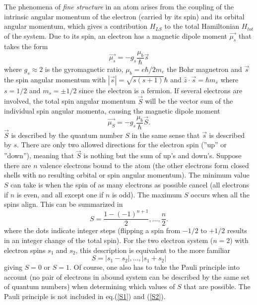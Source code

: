 \documentclass[a4paper]{article}
\begin{document}
The phenomena of \textit{fine structure} in an atom arises from the coupling of the intrinsic angular momentum of the electron (carried by its spin) and its orbital angular momentum, which gives a contribution $H_{LS}$ to the total Hamiltonian $H_{tot}$ of the system. Due to its spin, an electron has a magnetic dipole moment $\vec{\mu_s}$ that takes the form
\begin{equation}
\vec{\mu_s} = -g_s \frac{\mu_b}{\hbar} \vec{s}
\end{equation}
where $g_s \approx 2$ is the gyromagnetic ratio, $\mu_b = e \hbar / 2m_e$ the Bohr magnetron and $\vec{s}$ the spin angular momentum with $|\vec{s}|=\sqrt{s(s+1)} \hbar$ and $\hat{z} \cdot \vec{s} = \hbar m_s$ where $s=1/2$ and $m_s = \pm 1/2$ since the electron is a fermion. If several electrons are involved, the total spin angular momentum $\vec{S}$ will be the vector sum of the individual spin angular momenta, causing the magnetic dipole moment
\begin{equation}
\vec{\mu_S} = -g_s \frac{\mu_b}{\hbar} \vec{S}. 	\label{muS}
\end{equation}
$\vec{S}$ is described by the quantum number $S$ in the same sense that $\vec{s}$ is described by $s$. There are only two allowed directions for the electron spin (''up'' or ''down''), meaning that $\vec{S}$ is nothing but the sum of up's and down's. Suppose there are $n$ valence electrons bound to the atom (the other electrons form closed shells with no resulting orbital or spin angular momentum). The minimum value $S$ can take is when the spin of as many electrons as possible cancel (all electrons if $n$ is even, and all except one if $n$ is odd). The maximum $S$ occurs when all the spins align. This can be summarized in
\begin{equation}
S = \frac{1-(-1)^{n+1}}{2} , \dots , \frac{n}{2}. \label{S1}
\end{equation}
where the dots indicate integer steps (flipping a spin from $-1/2$ to $+1/2$ results in an integer change of the total spin). For the two electron system ($n=2$) with electron spins $s_1$ and $s_2$, this description is equivalent to the more familiar
\begin{equation}
S = |s_1 - s_2|, \dots, |s_1 + s_2|			\label{S2}
\end{equation}
giving $S=0$ or $S=1$. Of course, one also has to take the Pauli principle into account (no pair of electrons in abound system can be described by the same set of quantum numbers) when determining which values of $S$ that are possible. The Pauli principle is not included in eq.(\ref{S1}) and (\ref{S2}).  
\end{document}
